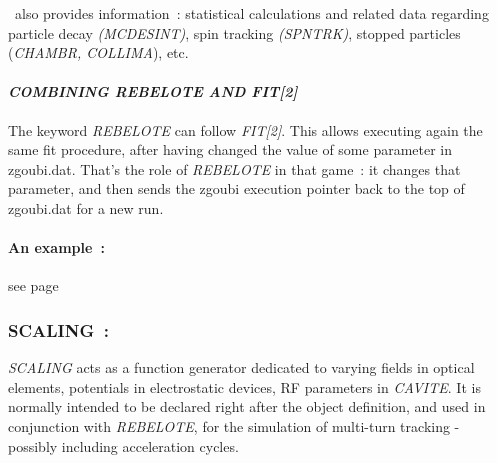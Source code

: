   
\bigskip

\noindent\REBELOTE\ also provides information~: statistical calculations and related 
data regarding particle decay \textsl{(MCDESINT)}, spin tracking  
\textsl{(SPNTRK)}, stopped particles (\textsl{CHAMBR,
 COLLIMA}), etc.  




\bigskip

\paragraph{\textit{COMBINING REBELOTE AND FIT[2]} }    %


\noindent The keyword  \textsl{REBELOTE}  can follow   \textsl{FIT[2]}.  This allows executing again 
the same fit procedure,  after having changed the value of some parameter in zgoubi.dat. 
That's the role of   \textsl{REBELOTE}  in that game~: it changes that parameter, and then sends the 
zgoubi execution pointer back to the top of zgoubi.dat for a new run. 

\paragraph{An example~: } see page~\pageref{ExaFITREBELOTE}







 \newpage

\subsubsection*{SCALING~: \SCALINGTitl} \label{SCALING}  
\medskip 
{}

\textsl{SCALING} acts as a function generator dedicated to varying 
fields in optical elements, potentials in 
electrostatic devices, RF parameters in \textsl{CAVITE}. It is normally intended
to be declared right after the object definition, and used in conjunction 
with \textsl{REBELOTE}, for the simulation of multi-turn tracking - possibly including  acceleration
 cycles.  

\bigskip

